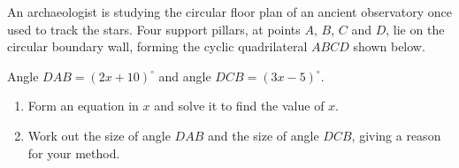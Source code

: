 \begin{question}
\noindent An archaeologist is studying the circular floor plan of an ancient observatory once used to track the stars. Four support pillars, at points $A$, $B$, $C$ and $D$, lie on the circular boundary wall, forming the cyclic quadrilateral $ABCD$ shown below.

\begin{center}
\end{center}

\noindent Angle $DAB = (2x+10)^\circ$ and angle $DCB = (3x-5)^\circ$.

\begin{enumerate}
    \item[(a)] Form an equation in $x$ and solve it to find the value of $x$.

    \vspace{4cm}

    \item[(b)] Work out the size of angle $DAB$ and the size of angle $DCB$, giving a reason for your method.

    \vspace{4cm}
\end{enumerate}
\end{question}
